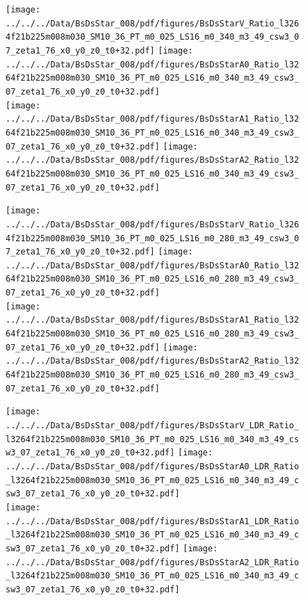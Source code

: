 \documentclass[a4paper,10pt]{article}
\begin{document}
\begin{figure}[p]
 \texttt{[image: ../../../Data/BsDsStar\_008/pdf/figures/BsDsStarV\_Ratio\_l3264f21b225m008m030\_SM10\_36\_PT\_m0\_025\_LS16\_m0\_340\_m3\_49\_csw3\_07\_zeta1\_76\_x0\_y0\_z0\_t0+32.pdf]}  
\texttt{[image: ../../../Data/BsDsStar\_008/pdf/figures/BsDsStarA0\_Ratio\_l3264f21b225m008m030\_SM10\_36\_PT\_m0\_025\_LS16\_m0\_340\_m3\_49\_csw3\_07\_zeta1\_76\_x0\_y0\_z0\_t0+32.pdf]} \\ 
\texttt{[image: ../../../Data/BsDsStar\_008/pdf/figures/BsDsStarA1\_Ratio\_l3264f21b225m008m030\_SM10\_36\_PT\_m0\_025\_LS16\_m0\_340\_m3\_49\_csw3\_07\_zeta1\_76\_x0\_y0\_z0\_t0+32.pdf]}  
\texttt{[image: ../../../Data/BsDsStar\_008/pdf/figures/BsDsStarA2\_Ratio\_l3264f21b225m008m030\_SM10\_36\_PT\_m0\_025\_LS16\_m0\_340\_m3\_49\_csw3\_07\_zeta1\_76\_x0\_y0\_z0\_t0+32.pdf]} \\ 
\end{figure} 
\clearpage

\begin{figure}[p]
 \texttt{[image: ../../../Data/BsDsStar\_008/pdf/figures/BsDsStarV\_Ratio\_l3264f21b225m008m030\_SM10\_36\_PT\_m0\_025\_LS16\_m0\_280\_m3\_49\_csw3\_07\_zeta1\_76\_x0\_y0\_z0\_t0+32.pdf]}  
\texttt{[image: ../../../Data/BsDsStar\_008/pdf/figures/BsDsStarA0\_Ratio\_l3264f21b225m008m030\_SM10\_36\_PT\_m0\_025\_LS16\_m0\_280\_m3\_49\_csw3\_07\_zeta1\_76\_x0\_y0\_z0\_t0+32.pdf]} \\ 
\texttt{[image: ../../../Data/BsDsStar\_008/pdf/figures/BsDsStarA1\_Ratio\_l3264f21b225m008m030\_SM10\_36\_PT\_m0\_025\_LS16\_m0\_280\_m3\_49\_csw3\_07\_zeta1\_76\_x0\_y0\_z0\_t0+32.pdf]}  
\texttt{[image: ../../../Data/BsDsStar\_008/pdf/figures/BsDsStarA2\_Ratio\_l3264f21b225m008m030\_SM10\_36\_PT\_m0\_025\_LS16\_m0\_280\_m3\_49\_csw3\_07\_zeta1\_76\_x0\_y0\_z0\_t0+32.pdf]} \\ 
\end{figure} 
\clearpage

\begin{figure}[p]
 \texttt{[image: ../../../Data/BsDsStar\_008/pdf/figures/BsDsStarV\_LDR\_Ratio\_l3264f21b225m008m030\_SM10\_36\_PT\_m0\_025\_LS16\_m0\_340\_m3\_49\_csw3\_07\_zeta1\_76\_x0\_y0\_z0\_t0+32.pdf]}  
\texttt{[image: ../../../Data/BsDsStar\_008/pdf/figures/BsDsStarA0\_LDR\_Ratio\_l3264f21b225m008m030\_SM10\_36\_PT\_m0\_025\_LS16\_m0\_340\_m3\_49\_csw3\_07\_zeta1\_76\_x0\_y0\_z0\_t0+32.pdf]} \\ 
\texttt{[image: ../../../Data/BsDsStar\_008/pdf/figures/BsDsStarA1\_LDR\_Ratio\_l3264f21b225m008m030\_SM10\_36\_PT\_m0\_025\_LS16\_m0\_340\_m3\_49\_csw3\_07\_zeta1\_76\_x0\_y0\_z0\_t0+32.pdf]}  
\texttt{[image: ../../../Data/BsDsStar\_008/pdf/figures/BsDsStarA2\_LDR\_Ratio\_l3264f21b225m008m030\_SM10\_36\_PT\_m0\_025\_LS16\_m0\_340\_m3\_49\_csw3\_07\_zeta1\_76\_x0\_y0\_z0\_t0+32.pdf]} \\ 
\end{figure} 
\clearpage
\end{document}
